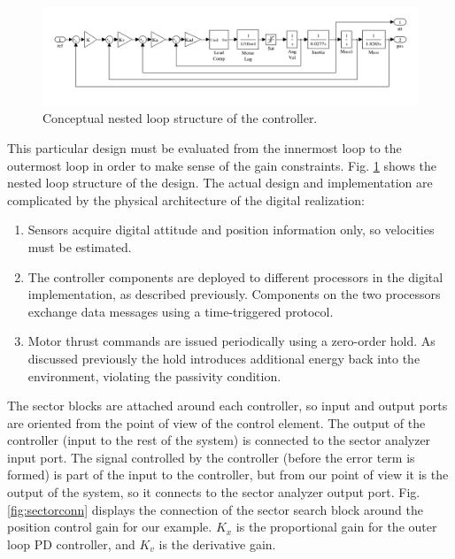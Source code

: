 \begin{figure}[htb]
\centering
\includegraphics[width=\columnwidth]{figures/quadrotor_loops}
    \caption{Conceptual nested loop structure of the controller.}
    \label{fig:quadrotor_loops}
\end{figure}

This particular design must be evaluated from the innermost loop to the outermost loop in order to make sense of the gain constraints. Fig. \ref{fig:quadrotor_loops} shows the nested loop structure of the design.  The actual design and implementation are complicated by the physical architecture of the digital realization: 

\begin{enumerate}
 \item Sensors acquire digital attitude and position information only, so velocities must be estimated.
 \item The controller components are deployed to different processors in the digital implementation, as described previously. Components on the two processors exchange data messages using a time-triggered protocol.
 \item Motor thrust commands are issued periodically using a zero-order hold.  As discussed previously the hold introduces additional energy back into the environment, violating the passivity condition.
\end{enumerate}

The sector blocks are attached around each controller, so input and output ports are oriented from the point of view of the control element.  The output of the controller (input to the rest of the system) is connected to the sector analyzer input port.  The signal controlled by the controller (before the error term is formed) is part of the input to the controller, but from our point of view it is the output of the system, so it connects to the sector
analyzer output port.  Fig. \ref{fig:sectorconn} displays the connection of the sector search block around the position control gain for our example. $K_x$ is the proportional gain for the outer loop PD controller, and $K_v$ is the derivative gain.  

